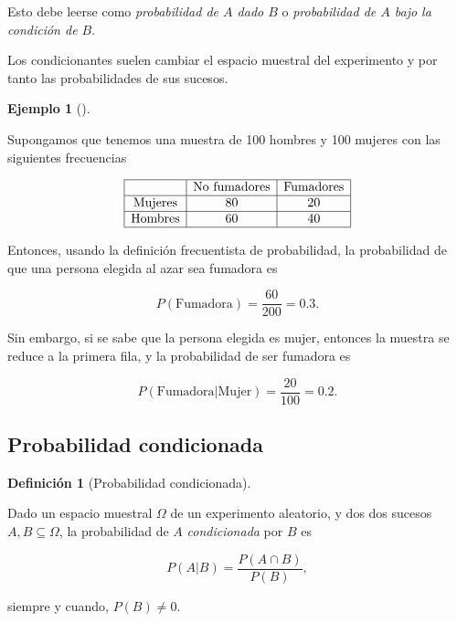 \documentclass[
  a4paper,
]{scrreport}
\theoremstyle{plain}
\theoremstyle{definition}
\newtheorem{definition}{Definición}[chapter]
\theoremstyle{definition}
\newtheorem{example}{Ejemplo}[chapter]
\theoremstyle{remark}
\begin{document}
Esto debe leerse como \emph{probabilidad de \(A\) dado \(B\)} o
\emph{probabilidad de \(A\) bajo la condición de \(B\)}.

Los condicionantes suelen cambiar el espacio muestral del experimento y
por tanto las probabilidades de sus sucesos.

\begin{example}[]\protect\hypertarget{exm-sucesos-condicionados}{}\label{exm-sucesos-condicionados}

Supongamos que tenemos una muestra de 100 hombres y 100 mujeres con las
siguientes frecuencias

\[
\begin{array}{|c|c|c|}
\hline 
 & \mbox{No fumadores} & \mbox{Fumadores} \\
 \hline 
 \mbox{Mujeres} & 80 & 20 \\
 \hline
 \mbox{Hombres} & 60 & 40 \\
 \hline
\end{array}
\]

Entonces, usando la definición frecuentista de probabilidad, la
probabilidad de que una persona elegida al azar sea fumadora es

\[P(\mbox{Fumadora})= \frac{60}{200}=0.3.\]

Sin embargo, si se sabe que la persona elegida es mujer, entonces la
muestra se reduce a la primera fila, y la probabilidad de ser fumadora
es

\[P(\mbox{Fumadora}|\mbox{Mujer})=\frac{20}{100}=0.2.\]

\end{example}

\subsection{Probabilidad
condicionada}\label{probabilidad-condicionada-1}

\begin{definition}[Probabilidad
condicionada]\protect\hypertarget{def-probabilidad-condicionada}{}\label{def-probabilidad-condicionada}

Dado un espacio muestral \(\Omega\) de un experimento aleatorio, y dos
dos sucesos \(A,B\subseteq \Omega\), la probabilidad de \(A\)
\emph{condicionada} por \(B\) es

\[P(A|B) = \frac{P(A\cap B)}{P(B)},\]

siempre y cuando, \(P(B)\neq 0\).

\end{definition}
\end{document}

